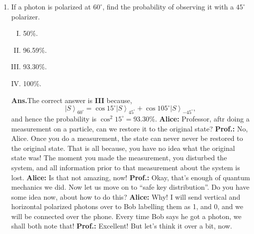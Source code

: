 \documentclass[12pt]{article}
\newcommand\rr{\right \rangle}
\newcommand\ls{\left |}
\newcommand\tbf[1]{\textbf{#1}}
\newcommand\ta{\tbf{Alice: }}
\newcommand\tp{\tbf{Prof.: }}
\newcommand\tans{\tbf{Ans.}}
\begin{document}
\begin{enumerate}[1.]
\tp It is interesting to see the difference between the classical ``Mallus' Law'' with this. Here we are considering only one photon, and unless we do a measurement we are not sure if the photon has passed through a certain polarizer, whereas for ``Mallus' Law'', there was only a beam of photons and there was no uncertainty. The average intensity was given by $I_0 \cos^2{\theta}$, where $\theta$ is the angle between the polarizing axis of the polarizer and the polarization vector of the electromagnetic wave. The uncertainty thus translates into the so called ``expectation value''. \newline
\ta I undertand. \newline
\item If a photon is polarized at $60^\circ$, find the probability of observing it with a $45^\circ$ polarizer.
\begin{enumerate}[I.]
\item 50\%.
\item 96.59\%.
\item 93.30\%.
\item 100\%. \newline
\end{enumerate}
\tans The correct answer is \tbf{III} because,
$$
\ls S \rr _{60^\circ} = \cos{15^\circ} \ls S \rr _{45^\circ}+\cos{105^\circ} \ls S \rr _{-45^\circ},
$$
and hence the probability is $\cos^2{15^\circ} = 93.30 \%$. \newline
\ta Professor, aftr doing a measurement on a particle, can we restore it to the original state? \newline
\tp No, Alice. Once you do a measurement, the state can never never be restored to the original state. That is all because, you have no idea what the original state was! The moment you made the measurement, you disturbed the system, and all information prior to that measurement about the system is lost. \newline
\ta Is that not amazing, now! \newline
\tp Okay, that's enough of quantum mechanics we did. Now let us move on to ``safe key distribution''. Do you have some idea now, about how to do this? \newline
\ta Why! I will send vertical and horizontal polarized photons over to Bob labelling them as 1, and 0, and we will be connected over the phone. Every time Bob says he got a photon, we shall both note that! \newline
\tp Excellent! But let's think it over a bit, now. \newline

\end{enumerate}
\end{document}
